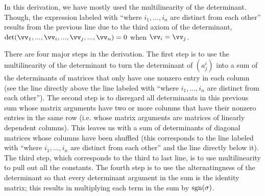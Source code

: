 \begin{deriv}
    In this derivation, we have mostly used the multilinearity of the determinant. Though, the expression labeled with ``where $i_1, ..., i_n$ are distinct from each other'' results from the previous line due to the third axiom of the determinant, $\det(\vv_1, ..., \vv_i, ..., \vv_j, ..., \vv_n) = 0$ when $\vv_i = \vv_j$.
    
    There are four major steps in the derivation. The first step is to use the multilinearity of the determinant to turn the determinant of $(a^i_j)$ into a sum of the determinants of matrices that only have one nonzero entry in each column (see the line directly above the line labeled with ``where $i_1, ..., i_n$ are distinct from each other''). The second step is to disregard all determinants in this previous sum whose matrix arguments have two or more columns that have their nonzero entries in the same row (i.e. whose matrix arguments are matrices of linearly dependent columns). This leaves us with a sum of determinants of diagonal matrices whose columns have been shuffled (this corresponds to the line labeled with ``where $i_1, ..., i_n$ are distinct from each other'' and the line directly below it). The third step, which corresponds to the third to last line, is to use multilinearity to pull out all the constants. The fourth step is to use the alternatingness of the determinant so that every determinant argument in the sum is the identity matrix; this results in multiplying each term in the sum by $\text{sgn}(\sigma)$.
\end{deriv}

